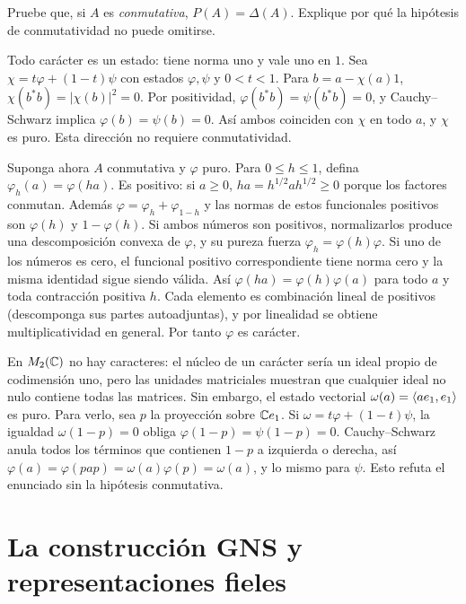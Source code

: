\begin{ejercicio}\label{ej:v3-l28-7}
Pruebe que, si $A$ es \emph{conmutativa}, $P(A)=\Delta(A)$. Explique por qué la hipótesis de conmutatividad no puede omitirse.
\end{ejercicio}
\begin{solucion}
Todo carácter es un estado: tiene norma uno y vale uno en $1$. Sea $\chi=t\varphi+(1-t)\psi$ con estados $\varphi,\psi$ y $0<t<1$. Para $b=a-\chi(a)1$, $\chi(b^*b)=|\chi(b)|^2=0$. Por positividad, $\varphi(b^*b)=\psi(b^*b)=0$, y Cauchy--Schwarz implica $\varphi(b)=\psi(b)=0$. Así ambos coinciden con $\chi$ en todo $a$, y $\chi$ es puro. Esta dirección no requiere conmutatividad.

Suponga ahora $A$ conmutativa y $\varphi$ puro. Para $0\le h\le1$, defina $\varphi_h(a)=\varphi(ha)$. Es positivo: si $a\ge0$, $ha=h^{1/2}ah^{1/2}\ge0$ porque los factores conmutan. Además $\varphi=\varphi_h+\varphi_{1-h}$ y las normas de estos funcionales positivos son $\varphi(h)$ y $1-\varphi(h)$. Si ambos números son positivos, normalizarlos produce una descomposición convexa de $\varphi$, y su pureza fuerza $\varphi_h=\varphi(h)\varphi$. Si uno de los números es cero, el funcional positivo correspondiente tiene norma cero y la misma identidad sigue siendo válida. Así $\varphi(ha)=\varphi(h)\varphi(a)$ para todo $a$ y toda contracción positiva $h$. Cada elemento es combinación lineal de positivos (descomponga sus partes autoadjuntas), y por linealidad se obtiene multiplicatividad en general. Por tanto $\varphi$ es carácter.

En $M_2(\mathbb C)$ no hay caracteres: el núcleo de un carácter sería un ideal propio de codimensión uno, pero las unidades matriciales muestran que cualquier ideal no nulo contiene todas las matrices. Sin embargo, el estado vectorial $\omega(a)=\left\langle ae_1,e_1\right\rangle$ es puro. Para verlo, sea $p$ la proyección sobre $\mathbb C e_1$. Si $\omega=t\varphi+(1-t)\psi$, la igualdad $\omega(1-p)=0$ obliga $\varphi(1-p)=\psi(1-p)=0$. Cauchy--Schwarz anula todos los términos que contienen $1-p$ a izquierda o derecha, así $\varphi(a)=\varphi(pap)=\omega(a)\varphi(p)=\omega(a)$, y lo mismo para $\psi$. Esto refuta el enunciado sin la hipótesis conmutativa.
\end{solucion}

\chapter{La construcción GNS y representaciones fieles}

